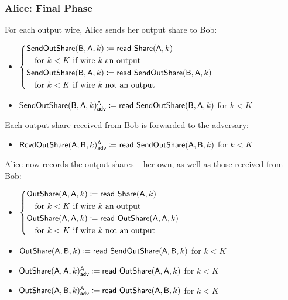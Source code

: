 \subsubsection{Alice: Final Phase}
For each output wire, Alice sends her output share to Bob:
\begin{itemize}
\item $\begin{cases*} \SendOutShare(\B,\A,k) \coloneqq \read{\Share(\A,k)} \\ \hspace{10pt} \text{for $k < K$ if wire $k$ an output} \\ \SendOutShare(\B,\A,k) \coloneqq \read{\SendOutShare(\B,\A,k)} \\ \hspace{10pt} \text{for $k < K$ if wire $k$ not an output} \end{cases*}$
\item {\color{blue} $\mathsf{SendOutShare}(\mathsf{B},\mathsf{A},k)^{\mathsf{A}}_{\mathsf{adv}} \coloneqq \mathsf{read} \ \mathsf{SendOutShare}(\mathsf{B},\mathsf{A},k)$ for $k < K$}
\end{itemize}
Each output share received from Bob is forwarded to the adversary:
\begin{itemize}
\item {\color{blue} $\mathsf{RcvdOutShare}(\mathsf{A},\mathsf{B},k)^{\mathsf{A}}_{\mathsf{adv}} \coloneqq \mathsf{read} \ \mathsf{SendOutShare}(\mathsf{A},\mathsf{B},k)$ for $k < K$}
\end{itemize}
Alice now records the output shares -- her own, as well as those received from Bob:
\begin{itemize}
\item $\begin{cases*} \OutShare(\A,\A,k) \coloneqq \read{\Share(\A,k)} \\ \hspace{10pt} \text{for $k < K$ if wire $k$ an output} \\ \OutShare(\A,\A,k) \coloneqq \read{\OutShare(\A,\A,k)} \\ \hspace{10pt} \text{for $k < K$ if wire $k$ not an output} \end{cases*}$
\item $\mathsf{OutShare}(\mathsf{A},\mathsf{B},k) \coloneqq \mathsf{read} \ \mathsf{SendOutShare}(\mathsf{A},\mathsf{B},k)$ for $k < K$
\item {\color{blue} $\mathsf{OutShare}(\mathsf{A},\mathsf{A},k)^{\mathsf{A}}_{\mathsf{adv}} \coloneqq \mathsf{read} \ \mathsf{OutShare}(\mathsf{A},\mathsf{A},k)$ for $k < K$}
\item {\color{blue} $\mathsf{OutShare}(\mathsf{A},\mathsf{B},k)^{\mathsf{A}}_{\mathsf{adv}} \coloneqq \mathsf{read} \ \mathsf{OutShare}(\mathsf{A},\mathsf{B},k)$ for $k < K$}
\end{itemize}
